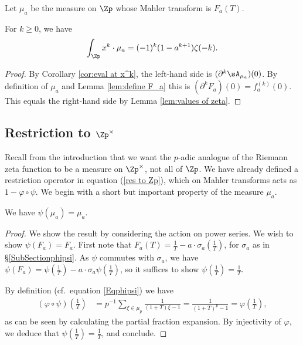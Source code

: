 \documentclass[a4paper,10pt, english, reqno]{smfart}
\numberwithin{equation}{section}
\begin{document}
\begin{definition} \label{DefinitionMeasuremua}
Let $\mu_a$ be the measure on $\Zp$ whose Mahler transform is $F_a(T)$.
\end{definition}

\begin{proposition}
For $k\geq 0$, we have
\[\int_{\Zp}x^k \cdot\mu_a = (-1)^k(1-a^{k+1}) \zeta(-k).\]
\end{proposition}

\begin{proof}
By Corollary \ref{cor:eval at x^k}, the left-hand side is $(\partial^k\sA_{\mu_a})(0)$. By definition of $\mu_a$ and Lemma \ref{lem:define F_a} this is $(\partial^kF_a)(0) = f_a^{(k)}(0)$. This equals the right-hand side by Lemma \ref{lem:values of zeta}.
\end{proof}

\subsection{Restriction to $\Zp^\times$}

Recall from the introduction that we want the $p$-adic analogue of the Riemann zeta function to be a measure on $\Zp^\times$, not all of $\Zp$. We have already defined a restriction operator in equation (\ref{res to Zp}), which on Mahler transforms acts as $1 - \varphi\circ\psi$.  We begin with a short but important property of the measure $\mu_a$.

\begin{lemma} \label{LemmaPsiInvariant}
We have $\psi(\mu_a) = \mu_a$.
\end{lemma}

\begin{proof}
We show the result by considering the action on power series. We wish to show $\psi(F_a) = F_a$. First note that $F_a(T) = \frac{1}{T} - a \cdot\sigma_a(\frac{1}{T})$, for $\sigma_a$ as in \S\ref{SubSectionphipsi}. As $\psi$ commutes with $\sigma_a$, we have $\psi(F_a) = \psi(\frac{1}{T}) - a\cdot \sigma_a\psi(\frac{1}{T})$, so it suffices to show $\psi(\frac{1}{T}) = \frac{1}{T}$.

By definition (cf.\ equation \eqref{Eqphipsi}) we have 
\begin{align*} (\varphi \circ \psi) \left(\frac{1}{T}\right) &= p^{-1} \sum_{\xi \in \mu_p} \frac{1}{ (1 + T) \xi - 1} = \frac{1}{(1 + T)^p - 1} = \varphi\left(\frac{1}{T}\right), 
\end{align*}
as can be seen by calculating the partial fraction expansion. By injectivity of $\varphi$, we deduce that $\psi(\frac{1}{T}) = \frac{1}{T}$, and conclude.
\end{proof}
\end{document}
